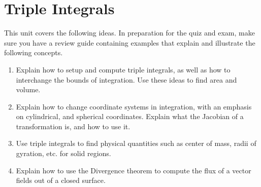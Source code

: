 \documentclass[10pt,]{book}
\theoremstyle{plain}
\theoremstyle{definition}
\theoremstyle{definition}
\theoremstyle{definition}
\theoremstyle{definition}
\theoremstyle{definition}
\numberwithin{equation}{section}
\begin{document}
\chapter[{Triple Integrals}]{Triple Integrals}\label{chapter-13}
This unit covers the following ideas. In preparation for the quiz and exam, make sure you have a review guide containing examples that explain and illustrate the following concepts. \leavevmode%
\begin{enumerate}
\item\hypertarget{li-211}{}Explain how to setup and compute triple integrals, as well as how to interchange the bounds of integration. Use these ideas to find area and volume.%
\item\hypertarget{li-212}{}Explain how to change coordinate systems in integration, with an emphasis on cylindrical, and spherical coordinates. Explain what the Jacobian of a transformation is, and how to use it.%
\item\hypertarget{li-213}{}Use triple integrals to find physical quantities such as center of mass, radii of gyration, etc. for solid regions.%
\item\hypertarget{li-214}{}Explain how to use the Divergence theorem to compute the flux of a vector fields out of a closed surface.%
\end{enumerate}
%
\typeout{************************************************}
\typeout{************************************************}
\end{document}
